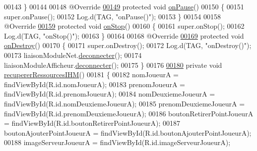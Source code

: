 \begin{DoxyCode}
00143     \}
00144 
00148     @Override
\hyperlink{classcom_1_1example_1_1area_1_1_i_h_m_gestion_partie_a05a8b1eabc376a9d06150eaed696e53e}{00149}     \textcolor{keyword}{protected} \textcolor{keywordtype}{void} \hyperlink{classcom_1_1example_1_1area_1_1_i_h_m_gestion_partie_a05a8b1eabc376a9d06150eaed696e53e}{onPause}()
00150     \{
00151         super.onPause();
00152         Log.d(TAG, \textcolor{stringliteral}{"onPause()"});
00153     \}
00154 
00158     @Override
\hyperlink{classcom_1_1example_1_1area_1_1_i_h_m_gestion_partie_a67aa6746480bdba2a5744a2ff8d6c48d}{00159}     \textcolor{keyword}{protected} \textcolor{keywordtype}{void} \hyperlink{classcom_1_1example_1_1area_1_1_i_h_m_gestion_partie_a67aa6746480bdba2a5744a2ff8d6c48d}{onStop}()
00160     \{
00161         super.onStop();
00162         Log.d(TAG, \textcolor{stringliteral}{"onStop()"});
00163     \}
00164 
00168     @Override
\hyperlink{classcom_1_1example_1_1area_1_1_i_h_m_gestion_partie_a5706132cc0d20b0c4a67fdc2e9c94a4e}{00169}     \textcolor{keyword}{protected} \textcolor{keywordtype}{void} \hyperlink{classcom_1_1example_1_1area_1_1_i_h_m_gestion_partie_a5706132cc0d20b0c4a67fdc2e9c94a4e}{onDestroy}()
00170     \{
00171         super.onDestroy();
00172         Log.d(TAG, \textcolor{stringliteral}{"onDestroy()"});
00173         liaisonModuleNet.\hyperlink{classcom_1_1example_1_1area_1_1_liaison_bluetooth_a10b356586feed95ecacb0a57cb51f0e6}{deconnecter}();
00174         liaisonModuleAfficheur.\hyperlink{classcom_1_1example_1_1area_1_1_liaison_bluetooth_a10b356586feed95ecacb0a57cb51f0e6}{deconnecter}();
00175     \}
00176 
\hyperlink{classcom_1_1example_1_1area_1_1_i_h_m_gestion_partie_a2161909470bc787c850df7266c44a0c2}{00180}     \textcolor{keyword}{private} \textcolor{keywordtype}{void} \hyperlink{classcom_1_1example_1_1area_1_1_i_h_m_gestion_partie_a2161909470bc787c850df7266c44a0c2}{recupererRessourcesIHM}()
00181     \{
00182         nomJoueurA = findViewById(R.id.nomJoueurA);
00183         prenomJoueurA = findViewById(R.id.prenomJoueurA);
00184         nomDeuxiemeJoueurA = findViewById(R.id.nomDeuxiemeJoueurA);
00185         prenomDeuxiemeJoueurA = findViewById(R.id.prenomDeuxiemeJoueurA);
00186         boutonRetirerPointJoueurA = findViewById(R.id.boutonRetirerPointJoueurA);
00187         boutonAjouterPointJoueurA = findViewById(R.id.boutonAjouterPointJoueurA);
00188         imageServeurJoueurA = findViewById(R.id.imageServeurJoueurA);

\end{DoxyCode}
